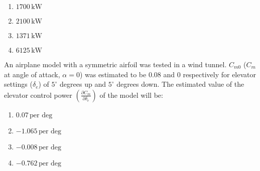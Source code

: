 \begin{multicols}{2}
    \begin{enumerate}
        \item $1700 \, \text{kW}$
        \item $2100 \, \text{kW}$
        \item $1371 \, \text{kW}$
        \item $6125 \, \text{kW}$
    \end{enumerate}
\end{multicols}
\bigskip
\item An airplane model with a symmetric airfoil was tested in a wind tunnel. $C_{m0}$ ($C_m$ at angle of attack, $\alpha = 0$) was estimated to be $0.08$ and $0$ respectively for elevator settings ($\delta_e$) of $5^\circ$ degrees up and $5^\circ$ degrees down. The estimated value of the elevator control power $\left(\frac{\partial C_m}{\partial \delta_e}\right)$ of the model will be:
\begin{multicols}{2}
    \begin{enumerate}
        \item $0.07 \, \text{per deg}$
        \item $-1.065 \, \text{per deg}$
        \item $-0.008 \, \text{per deg}$
        \item $-0.762 \, \text{per deg}$
    \end{enumerate}
\end{multicols}





